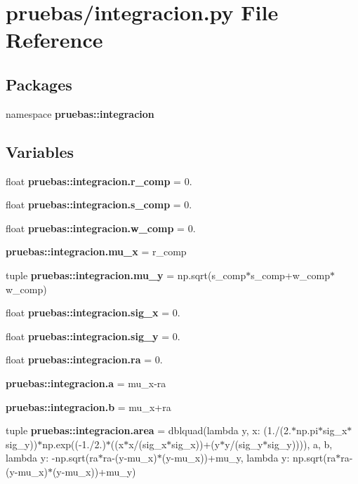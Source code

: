 \section{pruebas/integracion.py \-File \-Reference}
\label{integracion_8py}
\subsection*{\-Packages}
\begin{DoxyCompactItemize}
\item 
namespace {\bf pruebas\-::integracion}
\end{DoxyCompactItemize}
\subsection*{\-Variables}
\begin{DoxyCompactItemize}
\item 
float {\bf pruebas\-::integracion.\-r\-\_\-comp} = 0.
\item 
float {\bf pruebas\-::integracion.\-s\-\_\-comp} = 0.
\item 
float {\bf pruebas\-::integracion.\-w\-\_\-comp} = 0.
\item 
{\bf pruebas\-::integracion.\-mu\-\_\-x} = r\-\_\-comp
\item 
tuple {\bf pruebas\-::integracion.\-mu\-\_\-y} = np.\-sqrt(s\-\_\-comp$\ast$s\-\_\-comp+w\-\_\-comp$\ast$w\-\_\-comp)
\item 
float {\bf pruebas\-::integracion.\-sig\-\_\-x} = 0.
\item 
float {\bf pruebas\-::integracion.\-sig\-\_\-y} = 0.
\item 
float {\bf pruebas\-::integracion.\-ra} = 0.
\item 
{\bf pruebas\-::integracion.\-a} = mu\-\_\-x-\/ra
\item 
{\bf pruebas\-::integracion.\-b} = mu\-\_\-x+ra
\item 
tuple {\bf pruebas\-::integracion.\-area} = dblquad(lambda y, x\-: (1./(2.$\ast$np.\-pi$\ast$sig\-\_\-x$\ast$sig\-\_\-y))$\ast$np.\-exp((-\/1./2.)$\ast$((x$\ast$x/(sig\-\_\-x$\ast$sig\-\_\-x))+(y$\ast$y/(sig\-\_\-y$\ast$sig\-\_\-y)))), a, b, lambda y\-: -\/np.\-sqrt(ra$\ast$ra-\/(y-\/mu\-\_\-x)$\ast$(y-\/mu\-\_\-x))+mu\-\_\-y, lambda y\-: np.\-sqrt(ra$\ast$ra-\/(y-\/mu\-\_\-x)$\ast$(y-\/mu\-\_\-x))+mu\-\_\-y)
\end{DoxyCompactItemize}
